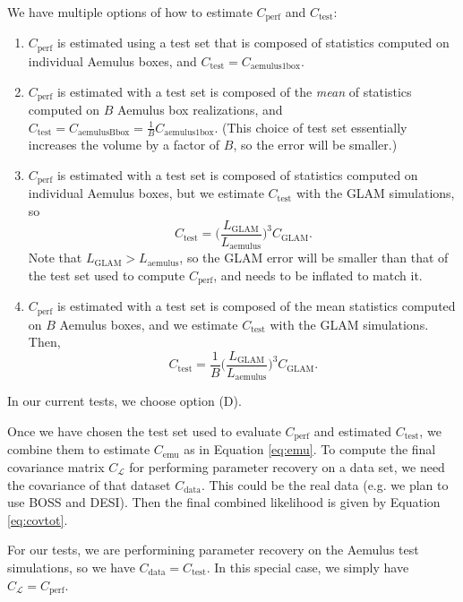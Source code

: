 \documentclass[12pt]{article}
\newcommand{\like}{\mathcal{L}}
\newcommand{\cov}[1]{C_\text{#1}}
\newcommand{\covtot}{C_\like}
\begin{document}
We have multiple options of how to estimate $\cov{perf}$ and $\cov{test}$: 
\begin{enumerate}[label=(\Alph*)]
    \item $\cov{perf}$ is estimated using a test set that is composed of statistics computed on individual Aemulus boxes, and $\cov{test} = \cov{aemulus1box}$.

    \item $\cov{perf}$ is estimated with a test set is composed of the \emph{mean} of statistics computed on $B$ Aemulus box realizations, and $\cov{test} = \cov{aemulusBbox} = \frac{1}{B}\cov{aemulus1box}$. 
    (This choice of test set essentially increases the volume by a factor of $B$, so the error will be smaller.)

    \item $\cov{perf}$ is estimated with a test set is composed of statistics computed on individual Aemulus boxes, but we estimate $\cov{test}$ with the GLAM simulations, so 
    \begin{equation}
        \cov{test} = \bigg( \frac{L_\text{GLAM} }{ L_\text{aemulus}} \bigg)^3  \cov{GLAM}.
    \end{equation}
    Note that $L_\text{GLAM} > L_\text{aemulus}$, so the GLAM error will be smaller than that of the test set used to compute $\cov{perf}$, and needs to be inflated to match it.
    
    \item $\cov{perf}$ is estimated with a test set is composed of the mean statistics computed on $B$ Aemulus boxes, and we estimate $\cov{test}$ with the GLAM simulations. Then,
    \begin{equation}
        \cov{test} =  \frac{1}{B}\bigg( \frac{L_\text{GLAM} }{ L_\text{aemulus}} \bigg)^3  \cov{GLAM}.
        \end{equation}

\end{enumerate}
In our current tests, we choose option (D). 

Once we have chosen the test set used to evaluate $\cov{perf}$ and estimated $\cov{test}$, we combine them to estimate $\cov{emu}$ as in Equation \ref{eq:emu}.
To compute the final covariance matrix $\covtot$ for performing parameter recovery on a data set, we need the covariance of that dataset $\cov{data}$.
This could be the real data (e.g. we plan to use BOSS and DESI). Then the final combined likelihood is given by Equation \ref{eq:covtot}.

For our tests, we are performining parameter recovery on the Aemulus test simulations, so we have $\cov{data} = \cov{test}$. 
In this special case, we simply have $\covtot = \cov{perf}$. 
\end{document}
